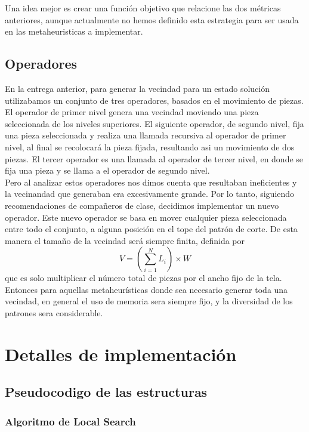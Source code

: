 \documentclass[letterpaper,11pt]{article}
\begin{document}
Una idea mejor es crear una funci\'on objetivo que relacione las dos m\'etricas anteriores, aunque actualmente no 
hemos definido esta estrategia para ser usada en las metaheuristicas a implementar.

\subsection{Operadores}

En la entrega anterior, para generar la vecindad para un estado soluci\'on utilizabamos un conjunto de tres operadores, basados en el movimiento de piezas. El operador
de primer nivel genera una vecindad moviendo una pieza seleccionada de los niveles superiores. El siguiente operador, de segundo nivel, fija una pieza seleccionada y realiza una llamada recursiva al operador de primer nivel, al final se recolocar\'a la pieza fijada, resultando asi un movimiento de dos piezas. El tercer operador es una llamada al operador de tercer nivel, en donde se fija una pieza y se llama a el operador de segundo nivel.\\

Pero al analizar estos operadores nos dimos cuenta que resultaban ineficientes y la vecinandad que generaban era excesivamente grande. Por lo tanto, siguiendo recomendaciones
de compa\~neros de clase, decidimos implementar un nuevo operador. Este nuevo operador se basa en mover cualquier pieza seleccionada entre todo el conjunto, a alguna posici\'on
en el tope del patr\'on de corte. De esta manera el tama\~no de la vecindad ser\'a siempre finita, definida por $$ V =  (\sum_{i = 1}^{N} L_i) \times W $$ que es solo multiplicar
el n\'umero total de piezas por el ancho fijo de la tela. Entonces para aquellas metaheur\'isticas donde sea necesario generar toda una vecindad, en general el uso de memoria
sera siempre fijo, y la diversidad de los patrones sera considerable.


\newpage

\section{Detalles de implementaci\'on}

\subsection{Pseudocodigo de las estructuras}

\subsubsection{Algoritmo de Local Search}
\end{document}

